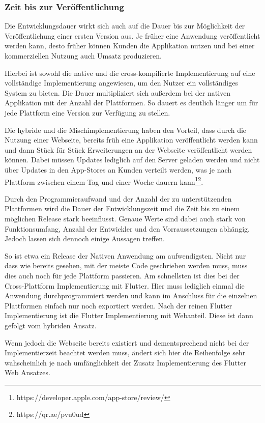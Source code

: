 \subsubsection{Zeit bis zur Veröffentlichung}
Die Entwicklungsdauer wirkt sich auch auf die Dauer bis zur Möglichkeit der Veröffentlichung einer ersten Version aus.
Je früher eine Anwendung veröffentlicht werden kann, desto früher können Kunden die Applikation nutzen und bei einer kommerziellen Nutzung auch Umsatz produzieren.

Hierbei ist sowohl die native und die cross-kompilierte Implementierung auf eine vollständige Implementierung angewiesen, um den Nutzer ein vollständiges System zu bieten. Die Dauer multipliziert sich außerdem bei der nativen Applikation mit der Anzahl der Plattformen. So dauert es deutlich länger um für jede Plattform eine Version zur Verfügung zu stellen.

Die hybride und die Mischimplementierung haben den Vorteil, dass durch die Nutzung einer Webseite, bereits früh eine Applikation veröffentlicht werden kann und dann Stück für Stück Erweiterungen an der Webseite veröffentlicht werden können. Dabei müssen Updates lediglich auf den Server geladen werden und nicht über Updates in den App-Stores an Kunden verteilt werden, was je nach Plattform zwischen einem Tag und einer Woche dauern kann\footnote{https://developer.apple.com/app-store/review/}\footnote{https://qr.ae/pvu0ud}. 

Durch den Programmieraufwand und der Anzahl der zu unterstützenden Plattformen wird die Dauer der Entwicklungszeit und die Zeit bis zu einem möglichen Release stark beeinflusst. Genaue Werte sind dabei auch stark von Funktionsumfang, Anzahl der Entwickler und den Vorraussetzungen abhängig. Jedoch lassen sich dennoch einige Aussagen treffen.

So ist etwa ein Release der Nativen Anwendung am aufwendigsten. Nicht nur dass wie bereits gesehen, mit der meiste Code geschrieben werden muss, muss dies auch noch für jede Plattform passieren. Am schnellsten ist dies bei der Cross-Plattform Implementierung mit Flutter. Hier muss lediglich einmal die Anwendung durchprogrammiert werden und kann im Anschluss für die einzelnen Plattformen einfach nur noch exportiert werden. Nach der reinen Flutter Implementierung ist die Flutter Implementierung mit Webanteil. Diese ist dann gefolgt vom hybriden Ansatz. 

Wenn jedoch die Webseite bereits existiert und dementsprechend nicht bei der Implementierzeit beachtet werden muss, ändert sich hier die Reihenfolge sehr wahscheinlich je nach umfänglichkeit der Zusatz Implementierung des Flutter Web Ansatzes.

